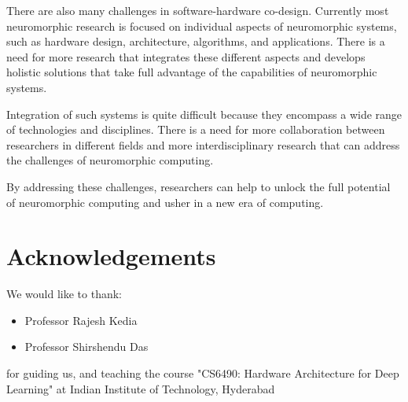 \documentclass[screen, acmtog]{acmart}
\begin{document}
There are also many challenges in software-hardware co-design. Currently most neuromorphic research is focused on individual aspects of neuromorphic systems, such as hardware design, architecture, algorithms, and applications. There is a need for more research that integrates these different aspects and develops holistic solutions that take full advantage of the capabilities of neuromorphic systems.

Integration of such systems is quite difficult because they encompass a wide range of technologies and disciplines. There is a need for more collaboration between researchers in different fields and more interdisciplinary research that can address the challenges of neuromorphic computing.

By addressing these challenges, researchers can help to unlock the full potential of neuromorphic computing and usher in a new era of computing.

\section{Acknowledgements}
We would like to thank:
\begin{itemize}
    \item Professor Rajesh Kedia
    \item Professor Shirshendu Das
\end{itemize}
for guiding us, and teaching the course "CS6490: Hardware Architecture for Deep Learning" at Indian Institute of Technology, Hyderabad



\end{document}
